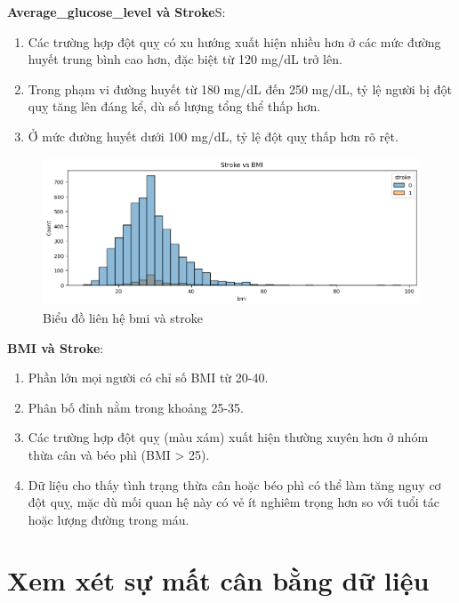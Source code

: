 \documentclass[11pt]{article}
\begin{document}
	\textbf{Average\_glucose\_level và Stroke}S:
	\begin{enumerate}
		\item Các trường hợp đột quỵ có xu hướng xuất hiện nhiều hơn ở các mức đường huyết trung bình cao hơn, đặc biệt từ 120 mg/dL trở lên.
		\item Trong phạm vi đường huyết từ 180 mg/dL đến 250 mg/dL, tỷ lệ người bị đột quỵ tăng lên đáng kể, dù số lượng tổng thể thấp hơn.
		\item Ở mức đường huyết dưới 100 mg/dL, tỷ lệ đột quỵ thấp hơn rõ rệt.
	\end{enumerate}
	
	
	\begin{figure}[H]
		\centering
		\includegraphics[width=1.0\linewidth]{bmiAndStroke}
		\caption{Biểu đồ liên hệ bmi và stroke}
		\label{fig:bmiandstroke}
	\end{figure}
	
	
	\textbf{BMI và Stroke}:
	\begin{enumerate}
		\item Phần lớn mọi người có chỉ số BMI từ 20-40.
		\item Phân bố đỉnh nằm trong khoảng 25-35.
		\item Các trường hợp đột quỵ (màu xám) xuất hiện thường xuyên hơn ở nhóm thừa cân và béo phì (BMI > 25).
		\item Dữ liệu cho thấy tình trạng thừa cân hoặc béo phì có thể làm tăng nguy cơ đột quỵ, mặc dù mối quan hệ này có vẻ ít nghiêm trọng hơn so với tuổi tác hoặc lượng đường trong máu.
	\end{enumerate}
	
	\section{Xem xét sự mất cân bằng dữ liệu}
	
\end{document}
